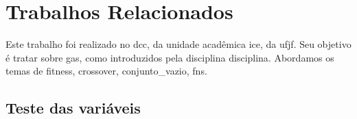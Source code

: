 \section{Trabalhos Relacionados}%
\label{sec:relacionados}


Este trabalho foi realizado no \gls{dcc}, da unidade acadêmica \gls{ice}, da \gls{ufjf}.
Seu objetivo é tratar sobre \glspl{ga}, como introduzidos pela disciplina \gls{disciplina}.
Abordamos os temas de \gls{fitness}, \gls{crossover}, \gls{conjunto_vazio}, \glspl{fn}.

\subsection{Teste das variáveis}%
\label{sec:teste_variaveis}

\testaVariaveis{}
